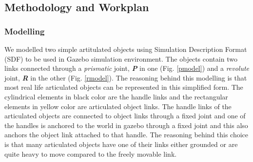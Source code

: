 \documentclass[12pt,a4paper]{report}
\begin{document}
\subsection{Methodology and Workplan}
\subsubsection{Modelling}

We modelled two simple artitulated objects using Simulation Description Format (SDF) to be used in Gazebo simulation environment. The objects contain two links connected through a \textit{prismatic} joint, \textit{\textbf{P}} in one (Fig. \ref{pmodel}) and a \textit{revolute} joint, \textit{\textbf{R}} in the other  (Fig. \ref{rmodel}). The reasoning behind this modelling is that most real life articulated objects can be represented in this simplified form. The cylindrical elements in black color are the handle links and the rectangular elements in yellow color are articulated object links. The handle links of the articulated objects are connected to object links through a fixed joint and one of the handles is anchored to the world in gazebo through a fixed joint and this also anchors the object link attached to that handle. The reasoning behind this choice is that many articulated objects have one of their links either grounded or are quite heavy to move compared to the freely movable link. 
\end{document}
